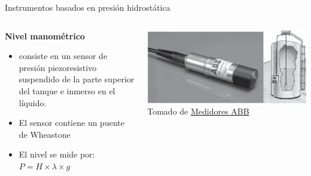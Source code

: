\documentclass[aspectratio=169]{beamer}
\begin{document}
\begin{frame}{Instrumentos basados en presión hidrostática}
    \begin{columns}[c, onlytextwidth]
        \begin{column}{0.45\textwidth}
        \textbf{Nivel manométrico}
            \begin{itemize}
                \item consiste en un sensor de presión piezoresistivo suspendido de la parte superior del tanque e inmerso en el líquido. 
                \item El sensor contiene un puente de Wheastone
                \item El nivel se mide por: 
                $P=H\times \lambda \times g$
            \end{itemize}
        \end{column}
        \begin{column}{0.50\textwidth}
            \includegraphics[width = 1.1\linewidth]{fig/Nivel/Manometrico.jpg}
            \tiny{Tomado de \cite{sole2005instrumentacion}}
            \tiny{\href{ https://sai-tech.mx/webpage/category/abb/medicion-y-analiticos/abb-medicion-nivel/}{Medidores ABB}}
           
        \end{column}
    \end{columns}
\end{frame}
\end{document}
